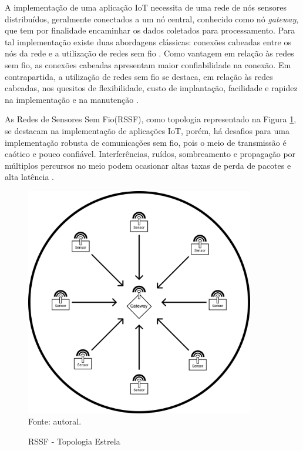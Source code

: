 A implementação de uma aplicação IoT necessita de uma rede de nós sensores distribuídos, geralmente conectados a um nó central, conhecido como nó \emph{gateway}, que tem por finalidade encaminhar os dados coletados para processamento. Para tal implementação existe duas abordagens clássicas: conexões cabeadas entre os nós da rede e a utilização de redes sem fio \cite{gomes2017estimaccao}. Como vantagem em relação às redes sem fio, as conexões cabeadas apresentam maior confiabilidade na conexão. Em contrapartida, a utilização de redes sem fio se destaca, em relação às redes cabeadas, nos quesitos de flexibilidade, custo de implantação, facilidade e rapidez na implementação e na manutenção \cite{gungor2009industrial}.

As Redes de Sensores Sem Fio(RSSF), como topologia representado na Figura \ref{fig:rssf}, se destacam na implementação de aplicações IoT, porém, há desafios para uma implementação robusta de comunicações sem fio, pois o meio de transmissão é caótico e pouco confiável. Interferências, ruídos, sombreamento e propagação por múltiplos percursos no meio podem ocasionar altas taxas de perda de pacotes e alta latência \cite{gomes2017estimaccao}.

\begin{figure}[ht]
      \begin{center}
            \caption{RSSF - Topologia Estrela}
            \includegraphics[width=10cm]{./sections/textual/chapters/images/intro_rssf.png}\\
            Fonte: autoral.
            \label{fig:rssf}
      \end{center}
\end{figure}

